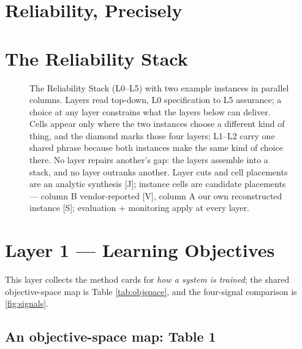\documentclass[11pt]{article}
\newcommand{\reliabilitystack}{Reliability Stack}
\begin{document}
\section{Reliability, Precisely}\label{sec:reliability}

\FloatBarrier

\section{The Reliability Stack}\label{sec:stack}


\begin{figure}[!t]
  \centering
  
  \caption{ The \reliabilitystack{} (L0--L5) with two example instances in parallel columns. Layers read top-down, L0 specification to L5 assurance; a choice at any layer constrains what the layers below can deliver. Cells appear only where the two instances choose a different kind of thing, and the diamond marks those four layers; L1--L2 carry one shared phrase because both instances make the same kind of choice there. No layer repairs another's gap: the layers assemble into a stack, and no layer outranks another. Layer cuts and cell placements are an analytic synthesis [J]; instance cells are candidate placements --- column B vendor-reported [V], column A our own reconstructed instance [S]; evaluation + monitoring apply at every layer.}
  \label{fig:stack}
\end{figure}
\FloatBarrier

\section{Layer 1 --- Learning Objectives}\label{sec:objectives}
\label{sec:objectives-cards}
This layer collects the method cards for \emph{how a system is trained}; the shared objective-space map is Table \ref{tab:objspace}, and the four-signal comparison is \cref{fig:signals}.

\subsection{An objective-space map: Table 1}
\label{sec:objspace}
\end{document}

